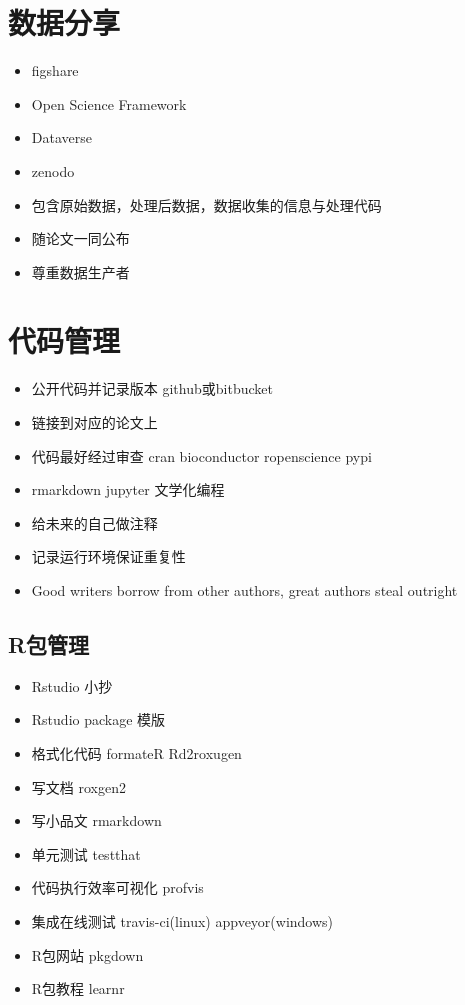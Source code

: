 \documentclass[]{book}
\providecommand{\tightlist}{%
  \setlength{\itemsep}{0pt}\setlength{\parskip}{0pt}}
\begin{document}
\section{数据分享}

\begin{itemize}
\tightlist
\item
  figshare
\item
  Open Science Framework
\item
  Dataverse
\item
  zenodo
\item
  包含原始数据，处理后数据，数据收集的信息与处理代码
\item
  随论文一同公布
\item
  尊重数据生产者
\end{itemize}

\section{代码管理}

\begin{itemize}
\tightlist
\item
  公开代码并记录版本 github或bitbucket
\item
  链接到对应的论文上
\item
  代码最好经过审查 cran bioconductor ropenscience pypi
\item
  rmarkdown jupyter 文学化编程
\item
  给未来的自己做注释
\item
  记录运行环境保证重复性
\item
  Good writers borrow from other authors, great authors steal outright
\end{itemize}

\subsection{R包管理}\label{r}

\begin{itemize}
\tightlist
\item
  Rstudio 小抄
\item
  Rstudio package 模版
\item
  格式化代码 formateR Rd2roxugen
\item
  写文档 roxgen2
\item
  写小品文 rmarkdown
\item
  单元测试 testthat
\item
  代码执行效率可视化 profvis
\item
  集成在线测试 travis-ci(linux) appveyor(windows)
\item
  R包网站 pkgdown
\item
  R包教程 learnr
\end{itemize}


\end{document}
